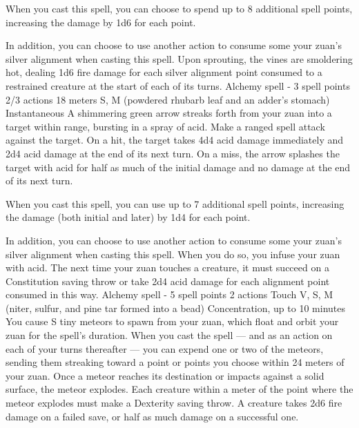         When you cast this spell, you can choose to spend up to 8 additional spell points, increasing the damage by 1d6 for each point.

        In addition, you can choose to use another action to consume some your zuan's silver alignment when casting this spell.
        Upon sprouting, the vines are smoldering hot, dealing 1d6 fire damage for each silver alignment point consumed to a restrained creature at the start of each of its turns.
        {Alchemy spell - 3 spell points}
        {2/3 actions}
        {18 meters}
        {S, M (powdered rhubarb leaf and an adder's stomach)}
        {Instantaneous}
        A shimmering green arrow streaks forth from your zuan into a target within range, bursting in a spray of acid.
        Make a ranged spell attack against the target.
        On a hit, the target takes 4d4 acid damage immediately and 2d4 acid damage at the end of its next turn.
        On a miss, the arrow splashes the target with acid for half as much of the initial damage and no damage at the end of its next turn.

        When you cast this spell, you can use up to 7 additional spell points, increasing the damage (both initial and later) by 1d4 for each point.

        In addition, you can choose to use another action to consume some your zuan's silver alignment when casting this spell.
        When you do so, you infuse your zuan with acid.
        The next time your zuan touches a creature, it must succeed on a Constitution saving throw or take 2d4 acid damage for each alignment point consumed in this way.
        {Alchemy spell - 5 spell points}
        {2 actions}
        {Touch}
        {V, S, M (niter, sulfur, and pine tar formed into a bead)}
        {Concentration, up to 10 minutes}
        You cause S tiny meteors to spawn from your zuan, which float and orbit your zuan for the spell's duration.
        When you cast the spell --- and as an action on each of your turns thereafter --- you can expend one or two of the meteors, sending them streaking toward a point or points you choose within 24 meters of your zuan.
        Once a meteor reaches its destination or impacts against a solid surface, the meteor explodes.
        Each creature within a meter of the point where the meteor explodes must make a Dexterity saving throw.
        A creature takes 2d6 fire damage on a failed save, or half as much damage on a successful one.

